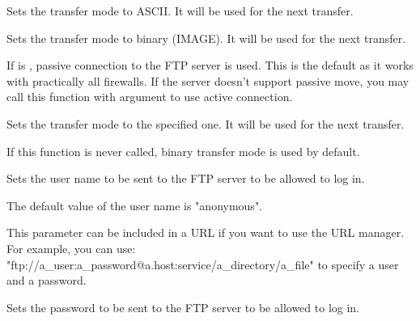
Sets the transfer mode to ASCII. It will be used for the next transfer.


\label{wxftpsetbinary}


Sets the transfer mode to binary (IMAGE). It will be used for the next transfer.


\label{wxftpsetpassive}


If  is \true, passive connection to the FTP server is used. This is
the default as it works with practically all firewalls. If the server doesn't
support passive move, you may call this function with \false argument to use
active connection.


\label{wxftpsettransfermode}


Sets the transfer mode to the specified one. It will be used for the next
transfer.

If this function is never called, binary transfer mode is used by default.



\label{wxftpsetuser}


Sets the user name to be sent to the FTP server to be allowed to log in.


The default value of the user name is "anonymous".


This parameter can be included in a URL if you want to use the URL manager.
For example, you can use: "ftp://a\_user:a\_password@a.host:service/a\_directory/a\_file"
to specify a user and a password.


\label{wxftpsetpassword}


Sets the password to be sent to the FTP server to be allowed to log in.


